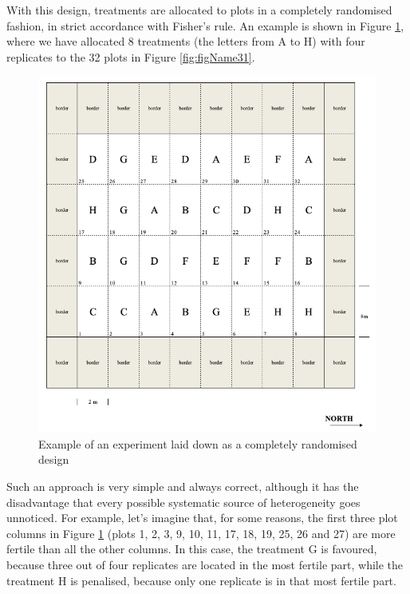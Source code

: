 \documentclass[a4paper,12pt,oneside]{book}
\begin{document}
With this design, treatments are allocated to plots in a completely randomised fashion, in strict accordance with Fisher's rule. An example is shown in Figure \ref{fig:figName33}, where we have allocated 8 treatments (the letters from A to H) with four replicates to the 32 plots in Figure \ref{fig:figName31}.

\begin{figure}

{\centering \includegraphics[width=0.97\linewidth]{_images/Mappa1CRD} 

}

\caption{Example of an experiment laid down as a completely randomised design}\label{fig:figName33}
\end{figure}

Such an approach is very simple and always correct, although it has the disadvantage that every possible systematic source of heterogeneity goes unnoticed. For example, let's imagine that, for some reasons, the first three plot columns in Figure \ref{fig:figName33} (plots 1, 2, 3, 9, 10, 11, 17, 18, 19, 25, 26 and 27) are more fertile than all the other columns. In this case, the treatment G is favoured, because three out of four replicates are located in the most fertile part, while the treatment H is penalised, because only one replicate is in that most fertile part.
\end{document}
